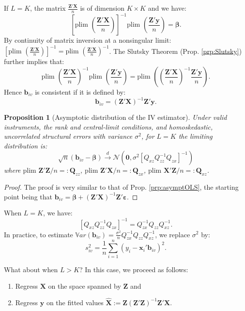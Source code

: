 \documentclass[
  11pt,
]{book}
\providecommand{\tightlist}{%
  \setlength{\itemsep}{0pt}\setlength{\parskip}{0pt}}
\newtheorem{proposition}{Proposition}[chapter]
\theoremstyle{definition}
\theoremstyle{definition}
\theoremstyle{definition}
\theoremstyle{definition}
\theoremstyle{remark}
\begin{document}
If \(L = K\), the matrix \(\frac{\mathbf{Z}'\mathbf{X}}{n}\) is of dimension \(K \times K\) and we have:
\[
\left[\mbox{plim }\left( \frac{\mathbf{Z}'\mathbf{X}}{n} \right)\right]^{-1}\mbox{plim }\left( \frac{\mathbf{Z}'\mathbf{y}}{n} \right) = \boldsymbol\beta.
\]
By continuity of matrix inversion at a nonsingular limit: \(\left[\mbox{plim }\left( \frac{\mathbf{Z}'\mathbf{X}}{n} \right)\right]^{-1}=\mbox{plim }\left( \frac{\mathbf{Z}'\mathbf{X}}{n} \right)^{-1}\).
The Slutsky Theorem (Prop. \ref{prp:Slutsky}) further implies that:
\[
\mbox{plim }\left( \frac{\mathbf{Z}'\mathbf{X}}{n} \right)^{-1} \mbox{plim }\left( \frac{\mathbf{Z}'\mathbf{y}}{n} \right)  = \mbox{plim }\left( \left( \frac{\mathbf{Z}'\mathbf{X}}{n} \right)^{-1} \frac{\mathbf{Z}'\mathbf{y}}{n} \right).
\]
Hence \(\mathbf{b}_{iv}\) is consistent if it is defined by:
\[
\boxed{\mathbf{b}_{iv} = (\mathbf{Z}'\mathbf{X})^{-1}\mathbf{Z}'\mathbf{y}.}
\]

\begin{proposition}[Asymptotic distribution of the IV estimator]
\protect\hypertarget{prp:IV}{}\label{prp:IV}Under valid instruments, the rank and central-limit conditions, and homoskedastic, uncorrelated structural errors with variance \(\sigma^2\), for \(L=K\) the limiting distribution is:
\[
\sqrt n(\mathbf{b}_{iv}-\boldsymbol\beta) \overset{d}{\rightarrow} \mathcal{N}\left(\mathbf{0},\sigma^2\left[Q_{xz}Q_{zz}^{-1}Q_{zx}\right]^{-1}\right)
\]
where \(\mbox{plim } \mathbf{Z}'\mathbf{Z}/n =: \mathbf{Q}_{zz}\), \(\mbox{plim } \mathbf{Z}'\mathbf{X}/n =: \mathbf{Q}_{zx}\), \(\mbox{plim } \mathbf{X}'\mathbf{Z}/n =: \mathbf{Q}_{xz}\).
\end{proposition}

\begin{proof}
The proof is very similar to that of Prop. \ref{prp:asymptOLS}, the starting point being that \(\mathbf{b}_{iv} = \boldsymbol\beta + (\mathbf{Z}'\mathbf{X})^{-1}\mathbf{Z}'\boldsymbol\varepsilon\).
\end{proof}

When \(L=K\), we have:
\[
\left[Q_{xz}Q_{zz}^{-1}Q_{zx}\right]^{-1}=Q_{zx}^{-1}Q_{zz}Q_{xz}^{-1}.
\]
In practice, to estimate \(\mathbb{V}ar(\mathbf{b}_{iv}) = \frac{\sigma^2}{n}Q_{zx}^{-1}Q_{zz}Q_{xz}^{-1}\), we replace \(\sigma^2\) by:
\[
s_{iv}^2 = \frac{1}{n}\sum_{i=1}^{n} (y_i - \mathbf{x}_i'\mathbf{b}_{iv})^2.
\]

What about when \(L > K\)? In this case, we proceed as follows:

\begin{enumerate}
\def\labelenumi{\arabic{enumi}.}
\tightlist
\item
  Regress \(\mathbf{X}\) on the space spanned by \(\mathbf{Z}\) and
\item
  Regress \(\mathbf{y}\) on the fitted values \(\hat{\mathbf{X}}:=\mathbf{Z}(\mathbf{Z}'\mathbf{Z})^{-1}\mathbf{Z}'\mathbf{X}\).
\end{enumerate}
\end{document}
